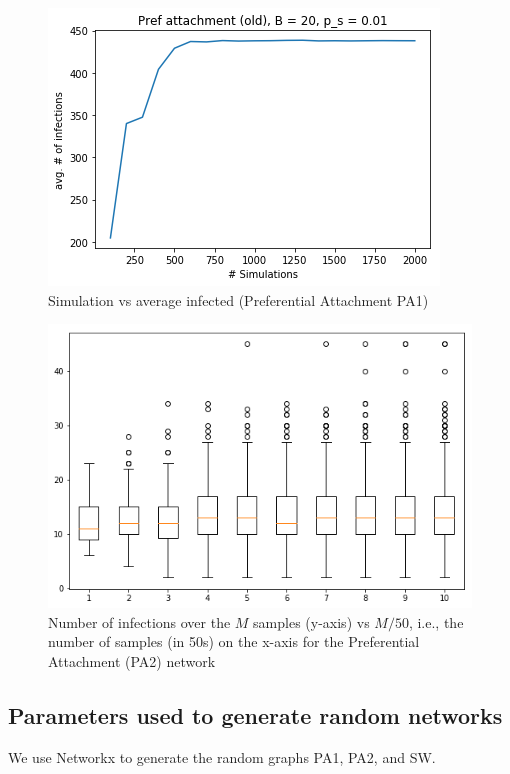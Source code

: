 \begin{figure}[!h]
    \centering
    \includegraphics[scale = 0.6]{Figuresnew/simulations.png}
    \caption{Simulation vs average infected (Preferential Attachment PA1)}
    \label{fig:pa_simvsavg}
\end{figure}

\begin{figure}[!h]
    \centering
    \includegraphics[scale = 0.42]{Figuresnew/boxplotPA2.png}
    \caption{Number of infections over the $M$ samples (y-axis) vs $M/50$, i.e., the number of samples (in 50s) on the x-axis
for the Preferential Attachment (PA2) network}
    \label{fig:pa2_bloxplot2}
\end{figure}

\subsection{Parameters used to generate random networks}
We use Networkx to generate the random graphs PA1, PA2, and SW.

